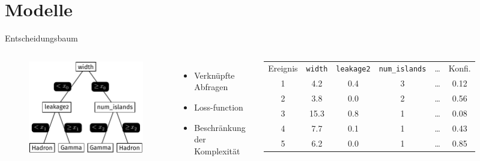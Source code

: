 \documentclass[aspectratio=1610, professionalfonts, 9pt]{beamer}
\begin{document}
\section{Modelle}
\begin{frame}{Entscheidungsbaum}
  \begin{columns}[onlytextwidth]
	\begin{figure}
	  \centering
	  \includegraphics[width=\textwidth]{./tikz/Tree/Tree.pdf}
	\end{figure}
	\begin{itemize}
	  \item Verknüpfte Abfragen 
	  \item Loss-function
	  \item Beschränkung der Komplexität 
	\end{itemize}
	\begin{table}	  
	  \centering
	  \begin{tabular}{c c c c c c}
		\toprule
		Ereignis & \texttt{width} & \texttt{leakage2} & \texttt{num\_islands} & \dots & Konfi. \\ 
		\cmidrule(r){1-1} 	\cmidrule{2-5} \cmidrule(l){6-6}
		1 & \num{4.2}  & \num{0.4}  & \num{3} & \dots & \num{0.12} \\
		2 & \num{3.8}  & \num{0.0}  & \num{2} & \dots & \num{0.56} \\
		3 & \num{15.3} & \num{0.8} 	& \num{1} & \dots & \num{0.08} \\
		4 & \num{7.7}  & \num{0.1}  & \num{1} & \dots & \num{0.43} \\
		5 & \num{6.2}  & \num{0.0}  & \num{1} & \dots & \num{0.85} \\
		\bottomrule
	  \end{tabular}
	\end{table}
  \end{columns}
\end{frame}
\end{document}

